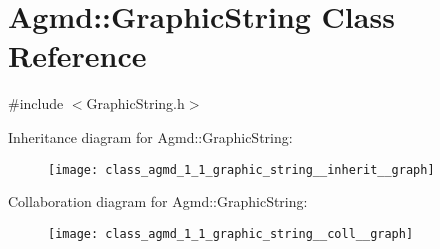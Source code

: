\hypertarget{class_agmd_1_1_graphic_string}{\section{Agmd\+:\+:Graphic\+String Class Reference}
\label{class_agmd_1_1_graphic_string}
}


{\ttfamily \#include $<$Graphic\+String.\+h$>$}



Inheritance diagram for Agmd\+:\+:Graphic\+String\+:\nopagebreak
\begin{figure}[H]
\begin{center}
\leavevmode
\texttt{[image: class\_agmd\_1\_1\_graphic\_string\_\_inherit\_\_graph]}
\end{center}
\end{figure}


Collaboration diagram for Agmd\+:\+:Graphic\+String\+:\nopagebreak
\begin{figure}[H]
\begin{center}
\leavevmode
\texttt{[image: class\_agmd\_1\_1\_graphic\_string\_\_coll\_\_graph]}
\end{center}
\end{figure}
